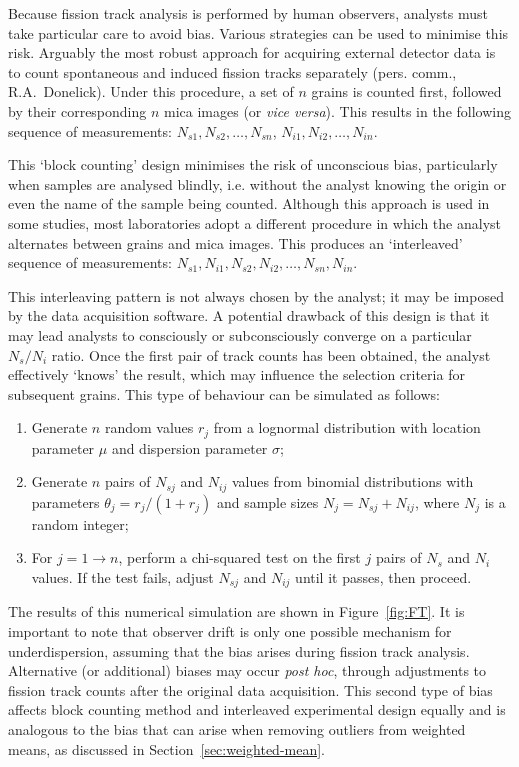 \documentclass{article}
\begin{document}
Because fission track analysis is performed by human observers,
analysts must take particular care to avoid bias. Various strategies
can be used to minimise this risk. Arguably the most robust approach
for acquiring external detector data is to count spontaneous and
induced fission tracks separately (pers. comm., R.A.~Donelick). Under
this procedure, a set of $n$ grains is counted first, followed by
their corresponding $n$ mica images (or \emph{vice versa}). This
results in the following sequence of measurements: $N_{s1}, N_{s2},
\ldots, N_{sn}$, $N_{i1}, N_{i2}, \ldots, N_{in}$.\medskip

This `block counting' design minimises the risk of unconscious bias,
particularly when samples are analysed blindly, i.e. without the
analyst knowing the origin or even the name of the sample being
counted. Although this approach is used in some studies, most
laboratories adopt a different procedure in which the analyst
alternates between grains and mica images. This produces an
`interleaved' sequence of measurements: $N_{s1}, N_{i1}, N_{s2},
N_{i2}, \ldots, N_{sn}, N_{in}$.\medskip

This interleaving pattern is not always chosen by the analyst; it may
be imposed by the data acquisition software. A potential drawback of
this design is that it may lead analysts to consciously or
subconsciously converge on a particular $N_s/N_i$ ratio. Once the
first pair of track counts has been obtained, the analyst effectively
`knows' the result, which may influence the selection criteria for
subsequent grains. This type of behaviour can be simulated as follows:

\begin{enumerate}
\item Generate $n$ random values $r_j$ from a lognormal distribution
  with location parameter $\mu$ and dispersion parameter $\sigma$;
\item Generate $n$ pairs of $N_{sj}$ and $N_{ij}$ values from binomial
  distributions with parameters $\theta_j = r_j/(1+r_j)$ and sample
  sizes $N_j = N_{sj} + N_{ij}$, where $N_j$ is a random integer;
\item For $j=1\rightarrow{n}$, perform a chi-squared test on the first
  $j$ pairs of $N_s$ and $N_i$ values. If the test fails, adjust
  $N_{sj}$ and $N_{ij}$ until it passes, then proceed.
\end{enumerate}

The results of this numerical simulation are shown in
Figure~\ref{fig:FT}. It is important to note that observer drift is
only one possible mechanism for underdispersion, assuming that the
bias arises during fission track analysis. Alternative (or additional)
biases may occur \emph{post hoc}, through adjustments to fission track
counts after the original data acquisition. This second type of bias
affects block counting method and interleaved experimental design
equally and is analogous to the bias that can arise when removing
outliers from weighted means, as discussed in
Section~\ref{sec:weighted-mean}.
\end{document}
